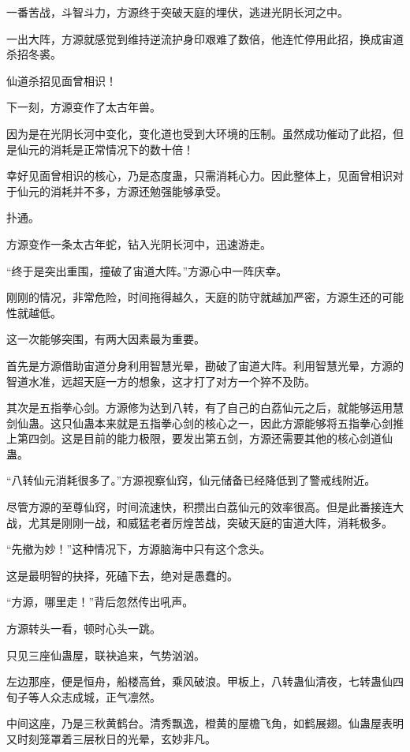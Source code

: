
\begin{this_body}

一番苦战，斗智斗力，方源终于突破天庭的埋伏，逃进光阴长河之中。

一出大阵，方源就感觉到维持逆流护身印艰难了数倍，他连忙停用此招，换成宙道杀招冬裘。

仙道杀招见面曾相识！

下一刻，方源变作了太古年兽。

因为是在光阴长河中变化，变化道也受到大环境的压制。虽然成功催动了此招，但是仙元的消耗是正常情况下的数十倍！

幸好见面曾相识的核心，乃是态度蛊，只需消耗心力。因此整体上，见面曾相识对于仙元的消耗并不多，方源还勉强能够承受。

扑通。

方源变作一条太古年蛇，钻入光阴长河中，迅速游走。

“终于是突出重围，撞破了宙道大阵。”方源心中一阵庆幸。

刚刚的情况，非常危险，时间拖得越久，天庭的防守就越加严密，方源生还的可能性就越低。

这一次能够突围，有两大因素最为重要。

首先是方源借助宙道分身利用智慧光晕，勘破了宙道大阵。利用智慧光晕，方源的智道水准，远超天庭一方的想象，这才打了对方一个猝不及防。

其次是五指拳心剑。方源修为达到八转，有了自己的白荔仙元之后，就能够运用慧剑仙蛊。这只仙蛊本来就是五指拳心剑的核心之一，因此方源能够将五指拳心剑推上第四剑。这是目前的能力极限，要发出第五剑，方源还需要其他的核心剑道仙蛊。

“八转仙元消耗很多了。”方源视察仙窍，仙元储备已经降低到了警戒线附近。

尽管方源的至尊仙窍，时间流速快，积攒出白荔仙元的效率很高。但是此番接连大战，尤其是刚刚一战，和威猛老者厉煌苦战，突破天庭的宙道大阵，消耗极多。

“先撤为妙！”这种情况下，方源脑海中只有这个念头。

这是最明智的抉择，死磕下去，绝对是愚蠢的。

“方源，哪里走！”背后忽然传出吼声。

方源转头一看，顿时心头一跳。

只见三座仙蛊屋，联袂追来，气势汹汹。

左边那座，便是恒舟，船楼高耸，乘风破浪。甲板上，八转蛊仙清夜，七转蛊仙四旬子等人众志成城，正气凛然。

中间这座，乃是三秋黄鹤台。清秀飘逸，橙黄的屋檐飞角，如鹤展翅。仙蛊屋表明又时刻笼罩着三层秋日的光晕，玄妙非凡。


\end{this_body}
